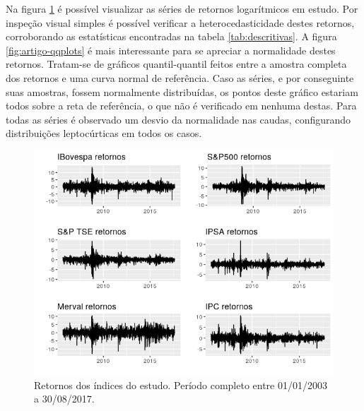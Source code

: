 \documentclass[review]{elsarticle}
\theoremstyle{definition}
\begin{document}


Na figura \ref{fig:artigo-retornos} é possível visualizar as séries de retornos logarítmicos em estudo. Por inspeção visual simples é possível verificar a heterocedasticidade destes retornos, corroborando as estatísticas encontradas na tabela \ref{tab:descritivas}. A figura \ref{fig:artigo-qqplots} é mais interessante para se apreciar a normalidade destes retornos. Tratam-se de gráficos quantil-quantil feitos entre a amostra completa dos retornos e uma curva normal de referência. Caso as séries, e por conseguinte suas amostras, fossem normalmente distribuídas, os pontos deste gráfico estariam todos sobre a reta de referência, o que não é verificado em nenhuma destas. Para todas as séries é observado um desvio da normalidade nas caudas, configurando distribuições leptocúrticas em todos os casos.

\begin{figure}[H]
	\centering
	\includegraphics[width=1\linewidth]{figs/artigo-retornos}
	\caption{Retornos dos índices do estudo. Período completo entre 01/01/2003 a 30/08/2017.}
	\label{fig:artigo-retornos}
\end{figure}
\end{document}
